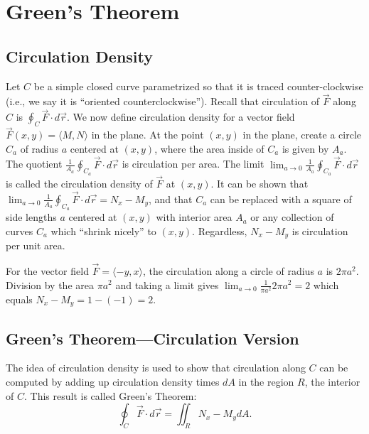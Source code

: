 \section{Green's Theorem}





\subsection{Circulation Density }
Let $C$ be a simple closed curve parametrized so that it is traced
counter-clockwise (i.e., we say it is ``oriented counterclockwise'').
Recall that circulation of $\vec F$ along $C$ is
$\oint_C \vec F \cdot d\vec r$.  We now define circulation density for a vector
field $\vec F(x,y)=\langle M,N\rangle$ in the plane. At the point
$(x,y)$ in the plane, create a circle $C_a$ of radius $a$ centered at
$(x,y)$, where the area inside of $C_a$ is given by $A_a$. The
quotient $\frac{1}{A_a}\oint_{C_a} \vec F \cdot d\vec r$ is circulation per
area.  The limit $\lim_{a\to 0} \frac{1}{A_a}\oint_{C_a} \vec F \cdot d\vec r$ is
called the circulation density of $\vec F$ at $(x,y)$.  It can be
shown that $\lim_{a\to 0} \frac{1}{A_a}\oint_{C_a} \vec F \cdot d\vec r =
N_x-M_y$, and that $C_a$ can be replaced with a square of side lengths
$a$ centered at $(x,y)$ with interior area $A_a$ or any collection of
curves $C_a$ which ``shrink nicely'' to $(x,y)$. Regardless, $N_x-M_y$ is
circulation per unit area.

\begin{example}
For the vector field $\vec F = \langle-y,x\rangle$, the
circulation along a circle of radius $a$ is $2\pi a^2$.  Division by the
area $\pi a^2$ and taking a  limit gives $\lim_{a\to 0}\frac{1}{\pi a^2}2\pi
a^2 = 2$ which equals $N_x-M_y = 1-(-1)=2$.
\end{example}

\subsection{Green's Theorem---Circulation Version }
The idea of circulation density is used to show that circulation along
$C$ can be computed by adding up circulation density times $dA$ in the region
$R$, the interior of $C$.  This result is called Green's Theorem:
 $$\oint_C
\vec F\cdot d\vec r = \iint_R N_x-M_ydA.$$


